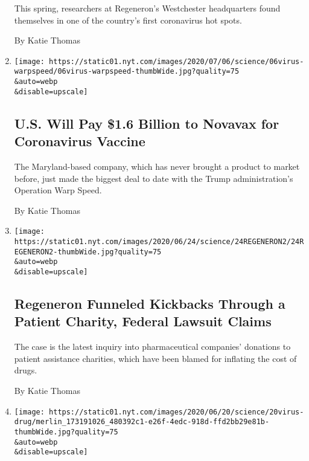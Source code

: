 \begin{enumerate}
  This spring, researchers at Regeneron's Westchester headquarters found
  themselves in one of the country's first coronavirus hot spots.

  By Katie Thomas
\item
  \href{/2020/07/07/health/novavax-coronavirus-vaccine-warp-speed.html}{}

  \texttt{[image: https://static01.nyt.com/images/2020/07/06/science/06virus-warpspeed/06virus-warpspeed-thumbWide.jpg?quality=75\\\&auto=webp\\\&disable=upscale]}

  \hypertarget{us-will-pay-16-billion-to-novavax-for-coronavirus-vaccine}{%
  \subsection{U.S. Will Pay \$1.6 Billion to Novavax for Coronavirus
  Vaccine}\label{us-will-pay-16-billion-to-novavax-for-coronavirus-vaccine}}

  The Maryland-based company, which has never brought a product to
  market before, just made the biggest deal to date with the Trump
  administration's Operation Warp Speed.

  By Katie Thomas
\item
  \href{/2020/06/24/health/drug-kickbacks-regeneron.html}{}

  \texttt{[image: https://static01.nyt.com/images/2020/06/24/science/24REGENERON2/24REGENERON2-thumbWide.jpg?quality=75\\\&auto=webp\\\&disable=upscale]}

  \hypertarget{regeneron-funneled-kickbacks-through-a-patient-charity-federal-lawsuit-claims}{%
  \subsection{Regeneron Funneled Kickbacks Through a Patient Charity,
  Federal Lawsuit
  Claims}\label{regeneron-funneled-kickbacks-through-a-patient-charity-federal-lawsuit-claims}}

  The case is the latest inquiry into pharmaceutical companies'
  donations to patient assistance charities, which have been blamed for
  inflating the cost of drugs.

  By Katie Thomas
\item
  \href{/2020/06/20/health/hydroxychloroquine-coronavirus-trial.html}{}

  \texttt{[image: https://static01.nyt.com/images/2020/06/20/science/20virus-drug/merlin\_173191026\_480392c1-e26f-4edc-918d-ffd2bb29e81b-thumbWide.jpg?quality=75\\\&auto=webp\\\&disable=upscale]}


\end{enumerate}
